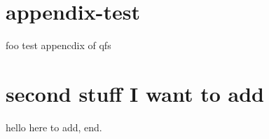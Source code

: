 \begin{appendices}
\section{appendix-test}
foo test appencdix of qfs
\section {second stuff I want to add}\label{appendix_first}
hello here to add, end.
\end{appendices}
